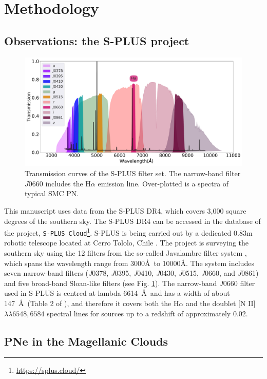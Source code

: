 \documentclass[fleqn,usenatbib]{mnras}
\begin{document}
\section{Methodology}
\label{sec:metho}
\subsection{Observations: the S-PLUS project}
\label{sec:obser}

\begin{figure}
    \includegraphics[width=0.8\linewidth]{Figs/splus-filter-pn}
    \caption{Transmission curves of the S-PLUS filter set. The narrow-band filter
      $J0660$ includes the H$\alpha$ emission line. Over-plotted is a spectra of typical SMC PN.}
    \label{fig:curves}
\end{figure}

This manuscript uses data from the S-PLUS DR4, which covers 3,000 square degrees of the southern sky. The S-PLUS DR4 can be accessed in the database of the project, \texttt{S-PLUS Cloud}\footnote{\url{https://splus.cloud/}}. S-PLUS is being carried out by a dedicated 0.83m robotic telescope located at Cerro Tololo, Chile \citep{Mendes:2019}.
The project is surveying the southern sky using the 12 filters from the so-called Javalambre filter system \citep{Marin-Franch:2012}, which spans the wavelength range from 3000\AA\ to 10000\AA. The system includes seven narrow-band filters
(\textit{J}0378, \textit{J}0395, \textit{J}0410, \textit{J}0430,
\textit{J}0515, \textit{J}0660,  and \textit{J}0861) 
and five broad-band Sloan-like \citep{Fukugita:1996} filters (see Fig. \ref{fig:curves}).
The narrow-band $J0660$ filter used in S-PLUS is centred at lambda 6614~\AA~and has a width of about 147~\AA~(Table 2 of \citealp{Mendes:2019}), and therefore it  covers both 
the H{$\alpha$} and the doublet [N II] \(\lambda\lambda 6548,6584\)  spectral lines for sources up to a redshift of approximately 0.02.

\subsection{PNe in the Magellanic Clouds}
\end{document}
